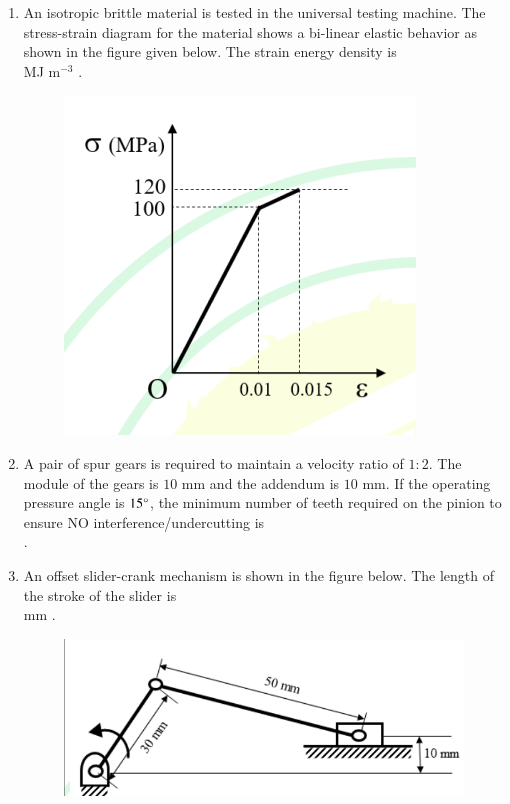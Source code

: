 \documentclass[journal]{IEEEtran}
\begin{document}
\begin{enumerate}[leftmargin=0pt]
\item
An isotropic brittle material is tested in the universal testing machine. The stress-strain diagram for the material shows a bi-linear elastic behavior as shown in the figure given below. The strain energy density is\\
\underline{\hspace{2cm}} MJ m$^{-3}$ .
\begin{figure}[H]\includegraphics[width=0.5\columnwidth]{Figs/image - 2025-08-24T170750.530.png}\caption*{}\label{fig:q58}\end{figure}
\hfill{}

\item
A pair of spur gears is required to maintain a velocity ratio of $1\colon 2$. The module of the gears is $10$ mm and the addendum is $10$ mm. If the operating pressure angle is $15\degree$, the minimum number of teeth required on the pinion to ensure NO interference/undercutting is\\
\underline{\hspace{2cm}} .

\hfill{}

\item
An offset slider-crank mechanism is shown in the figure below. The length of the stroke of the slider is\\
\underline{\hspace{2cm}} mm .
\begin{figure}[H]\includegraphics[width=0.5\columnwidth]{Figs/image - 2025-08-24T170849.218.png}\caption*{}\label{fig:q60}\end{figure}
\hfill{}


\end{enumerate}
\end{document}
